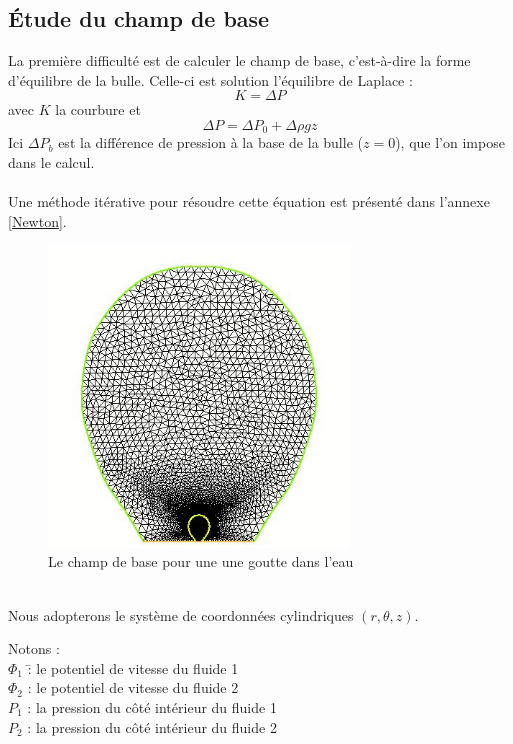 \documentclass[a4paper]{report}
\begin{document}
\subsection{Étude du champ de base}
La première difficulté est de calculer le champ de base, c'est-à-dire la forme d'équilibre de la bulle. Celle-ci est solution l'équilibre de Laplace :
\begin{equation}
K = \Delta P%
\end{equation}
avec $K$ la courbure et
$$
\Delta P = \Delta P_0 + \Delta \rho g z
$$
Ici $\Delta P_b$ est la différence de pression à la base de la bulle ($z=0$), que l'on impose dans le calcul.\\
\\
Une méthode itérative pour résoudre cette équation est présenté dans l'annexe \ref{Newton}.
\begin{figure}[h!] 
\begin{center}
\includegraphics[width=8cm]{4_1_1}
\caption{Le champ de base pour une une goutte dans l'eau}
\label{}
\end{center}
\end{figure}
\\
Nous adopterons le système de coordonnées cylindriques $(r,\theta,z)$.
\begin{tabbing}
Notons :\\
$\varPhi_1$ \= : le potentiel de vitesse du fluide 1\\
$\varPhi_2$ \> : le potentiel de vitesse du fluide 2\\
$P_1$       \> : la pression du côté intérieur du fluide 1\\
$P_2$       \> : la pression du côté intérieur du fluide 2
\end{tabbing}
\end{document}
